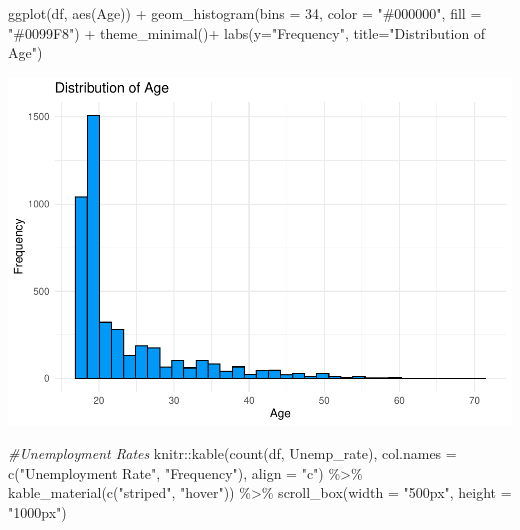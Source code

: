 \documentclass[
]{article}
\newenvironment{Shaded}{\begin{snugshade}}{\end{snugshade}}
\newcommand{\AttributeTok}[1]{\textcolor[rgb]{0.77,0.63,0.00}{#1}}
\newcommand{\CommentTok}[1]{\textcolor[rgb]{0.56,0.35,0.01}{\textit{#1}}}
\newcommand{\DecValTok}[1]{\textcolor[rgb]{0.00,0.00,0.81}{#1}}
\newcommand{\FunctionTok}[1]{\textcolor[rgb]{0.00,0.00,0.00}{#1}}
\newcommand{\NormalTok}[1]{#1}
\newcommand{\SpecialCharTok}[1]{\textcolor[rgb]{0.00,0.00,0.00}{#1}}
\newcommand{\StringTok}[1]{\textcolor[rgb]{0.31,0.60,0.02}{#1}}
\begin{document}
\begin{Shaded}
\begin{Highlighting}[]
\FunctionTok{ggplot}\NormalTok{(df, }\FunctionTok{aes}\NormalTok{(Age)) }\SpecialCharTok{+}
  \FunctionTok{geom\_histogram}\NormalTok{(}\AttributeTok{bins =} \DecValTok{34}\NormalTok{, }\AttributeTok{color =} \StringTok{"\#000000"}\NormalTok{, }\AttributeTok{fill =} \StringTok{"\#0099F8"}\NormalTok{) }\SpecialCharTok{+} \FunctionTok{theme\_minimal}\NormalTok{()}\SpecialCharTok{+}
  \FunctionTok{labs}\NormalTok{(}\AttributeTok{y=}\StringTok{"Frequency"}\NormalTok{, }\AttributeTok{title=}\StringTok{"Distribution of Age"}\NormalTok{)}
\end{Highlighting}
\end{Shaded}

\includegraphics{midterm_files/figure-latex/unnamed-chunk-12-1.pdf}

\begin{Shaded}
\begin{Highlighting}[]
\CommentTok{\#Unemployment Rates}
\NormalTok{knitr}\SpecialCharTok{::}\FunctionTok{kable}\NormalTok{(}\FunctionTok{count}\NormalTok{(df, }\StringTok{\textquotesingle{}Unemp\_rate\textquotesingle{}}\NormalTok{), }\AttributeTok{col.names =} \FunctionTok{c}\NormalTok{(}\StringTok{"Unemployment Rate"}\NormalTok{, }\StringTok{"Frequency"}\NormalTok{), }\AttributeTok{align =} \StringTok{"c"}\NormalTok{) }\SpecialCharTok{\%\textgreater{}\%}
  \FunctionTok{kable\_material}\NormalTok{(}\FunctionTok{c}\NormalTok{(}\StringTok{"striped"}\NormalTok{, }\StringTok{"hover"}\NormalTok{)) }\SpecialCharTok{\%\textgreater{}\%} 
 \FunctionTok{scroll\_box}\NormalTok{(}\AttributeTok{width =} \StringTok{"500px"}\NormalTok{, }\AttributeTok{height =} \StringTok{"1000px"}\NormalTok{)}
\end{Highlighting}
\end{Shaded}
\end{document}
